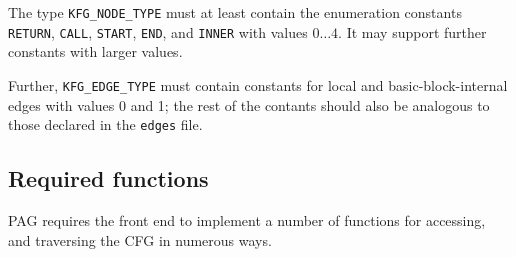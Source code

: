 The type \verb|KFG_NODE_TYPE| must at least contain the enumeration
constants \verb|RETURN|, \verb|CALL|, \verb|START|, \verb|END|, and
\verb|INNER| with values \(0\ldots4\). It may support further
constants with larger values.

Further, \verb|KFG_EDGE_TYPE| must contain constants for local and
basic-block-internal edges with values 0 and 1; the rest of the
contants should also be analogous to those declared in the
\verb|edges| file.

\subsection{Required functions}

PAG requires the front end to implement a number of functions for
accessing, and traversing the CFG in numerous ways.

